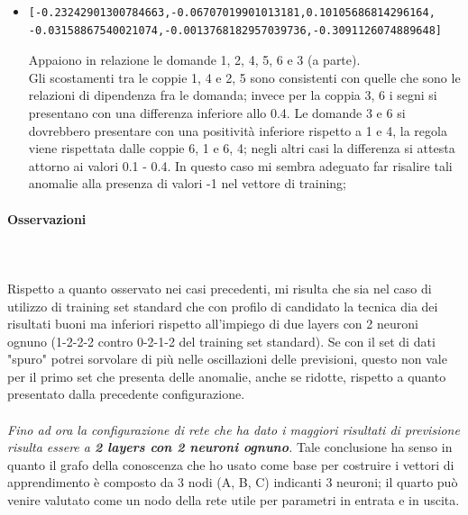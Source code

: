 \begin{itemize}
\item \begin{verbatim}[-0.23242901300784663,-0.06707019901013181,0.10105686814296164, -0.03158867540021074,-0.0013768182957039736,-0.3091126074889648]
\end{verbatim}
Appaiono in relazione le domande 1, 2, 4, 5, 6 e 3 (a parte).\\
Gli scostamenti tra le coppie 1, 4 e 2, 5 sono consistenti con quelle che sono le relazioni di dipendenza fra le domanda; invece per la coppia 3, 6 i segni si presentano con una differenza inferiore allo 0.4.
Le domande 3 e 6 si dovrebbero presentare con una positivit\`a inferiore rispetto a 1 e 4, la regola  viene rispettata  dalle coppie 6, 1 e  6, 4; negli altri casi la differenza si attesta attorno ai valori 0.1 - 0.4. In questo caso  mi sembra adeguato far risalire tali anomalie alla presenza di valori -1 nel vettore di training;
\end{itemize}

\paragraph{Osservazioni}\mbox{}
\label{Osservazioni su rete a 4 neuroni per 1 layer}
\\\\
\noindent
Rispetto a quanto osservato nei casi precedenti, mi risulta che sia nel caso di utilizzo di training set standard che con profilo di candidato la tecnica dia dei risultati buoni ma inferiori rispetto all'impiego di due layers con 2 neuroni ognuno (1-2-2-2 contro 0-2-1-2 del training set standard). Se con il set di dati "spuro" potrei sorvolare di pi\`u nelle oscillazioni delle previsioni, questo non vale per il primo set che presenta delle anomalie, anche se ridotte, rispetto a quanto presentato dalla precedente configurazione.
\\\\
\noindent
\textit{Fino ad ora la configurazione di rete che ha dato i maggiori risultati di previsione risulta essere a \textbf{2 layers con 2 neuroni ognuno}.}
Tale conclusione ha senso in quanto il grafo della conoscenza che ho usato come base per costruire i vettori di apprendimento \`e composto da 3 nodi (A, B, C) indicanti 3 neuroni; il quarto pu\`o venire valutato come un nodo della rete utile per parametri in entrata e in uscita.



